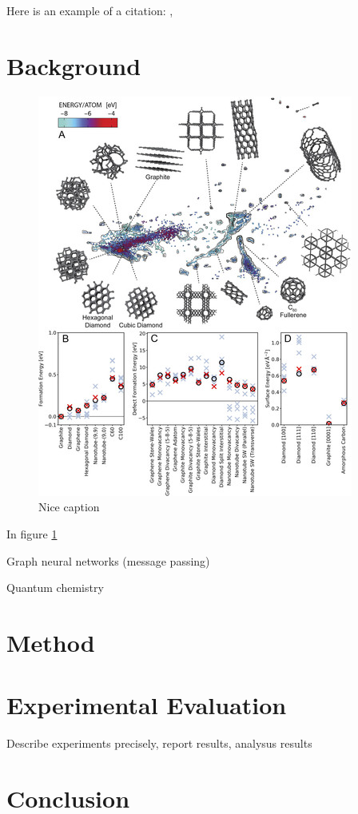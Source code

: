 \documentclass[12pt]{scrartcl}
\begin{document}
Here is an example of a citation: \cite{gap20}, \cite{DGL}

\newpage

\section{Background}

\begin{figure}
  \centering
  \includegraphics[scale=2]{carbon}
  
  \caption{Nice caption}\label{fig:my_figure}
\end{figure}

In figure \ref{fig:my_figure}

Graph neural networks (message passing)

Quantum chemistry

\newpage 

\section{Method}

\newpage

\section{Experimental Evaluation}

Describe experiments precisely, report results, analysus results

\newpage

\section{Conclusion}

\newpage



\end{document}
